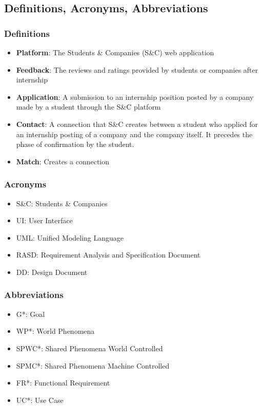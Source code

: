 
\subsection{Definitions, Acronyms, Abbreviations}

    \subsubsection{Definitions}
        \begin{itemize}
            \item \textbf{Platform}: 
            The Students \& Companies (S\&C) web application
            \item \textbf{Feedback}: 
            The reviews and ratings provided by students or companies after internship
            \item \textbf{Application}: 
            A submission to an internship position posted by a company made by a student through the S\&C platform  
            \item \textbf{Contact}: 
            A connection that S\&C creates between a student who applied for an internship posting of a company and the company itself. It precedes the phase of confirmation by the student.
            \item \textbf{Match}: 
            Creates a connection
        \end{itemize}

    
    \subsubsection{Acronyms}
        \begin{itemize}
            \item {S\&C: Students \& Companies}
            \item {UI: User Interface}
            \item {UML: Unified Modeling Language}
            \item {RASD: Requirement Analysis and Specification Document}
            \item {DD: Design Document}
        \end{itemize}
    

    \subsubsection{Abbreviations}
        \begin{itemize}
            \item {G*: Goal}
            \item {WP*: World Phenomena}
            \item {SPWC*: Shared Phenomena World Controlled}
            \item {SPMC*: Shared Phenomena Machine Controlled}
            \item {FR*: Functional Requirement}
            \item {UC*: Use Case}
        \end{itemize}

